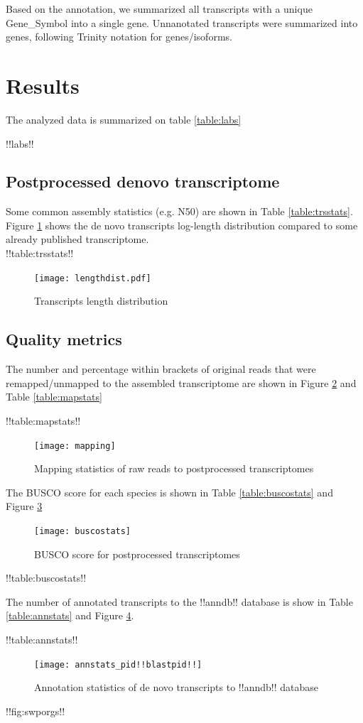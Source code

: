 \documentclass[12pt]{article}
\begin{document}
Based on the annotation, we summarized all transcripts with a unique Gene\_Symbol into a single gene. Unnanotated transcripts were summarized into genes, following Trinity notation for genes/isoforms.

\section{Results}

The analyzed data is summarized on table \ref{table:labs}

!!labs!! 

\subsection{Postprocessed denovo transcriptome}

Some common assembly statistics (e.g. N50) are shown in Table \ref{table:trsstats}. Figure \ref{fig:lengthdist} shows the de novo transcripts log-length distribution compared to some already published transcriptome.\\ 

!!table:trsstats!!

\begin{figure}
    \centering
    \texttt{[image: lengthdist.pdf]}
    \caption{Transcripts length distribution}
    \label{fig:lengthdist}
\end{figure}


\subsection{Quality metrics}
The number and percentage within brackets of original reads that were remapped/unmapped to the assembled transcriptome are shown in Figure \ref{fig:mapstats} and Table \ref{table:mapstats} 

!!table:mapstats!!

\begin{figure}
    \centering
    \texttt{[image: mapping]}
    \caption{Mapping statistics of raw reads to postprocessed transcriptomes}
    \label{fig:mapstats}
\end{figure}

The BUSCO score for each species is shown in Table \ref{table:buscostats} and Figure \ref{fig:buscostats}

\begin{figure}
    \centering
    \texttt{[image: buscostats]}
    \caption{BUSCO score for postprocessed transcriptomes}
    \label{fig:buscostats}
\end{figure}

!!table:buscostats!!

The number of annotated transcripts to the !!anndb!! database is show in Table \ref{table:annstats} and Figure \ref{fig:annstats}. 

!!table:annstats!!
\begin{figure}
    \centering
    \texttt{[image: annstats\_pid!!blastpid!!]}
    \caption{Annotation statistics of de novo transcripts to !!anndb!! database}
    \label{fig:annstats}
\end{figure}

!!fig:swporgs!!

\newpage


\end{document}
